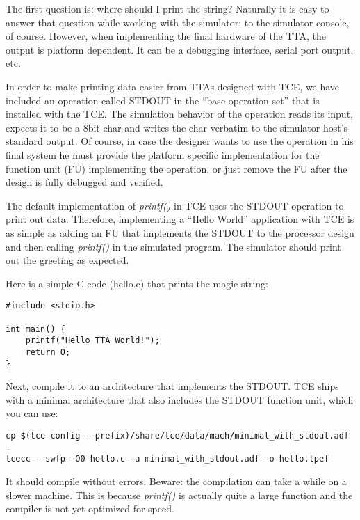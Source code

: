 \documentclass[twoside]{tceusermanual}
\begin{document}
The first question is: where should I print the string? Naturally 
it is easy to answer that question while working with the simulator: to
the simulator console, of course. However, when implementing the final
hardware of the TTA, the output is platform dependent. It can be a
debugging interface, serial port output, etc.

In order to make printing data easier from TTAs designed
with TCE, we have included an operation called STDOUT in the ``base operation 
set'' that is installed with the TCE. The simulation behavior of the 
operation reads its input, expects it to be a 8bit char and writes the char
verbatim to the simulator host's standard output. Of course, in case the 
designer wants to use the operation in his final system he must provide the 
platform specific implementation for the function unit (FU) implementing the 
operation, or just remove the FU after the design is fully debugged and
verified.

The default implementation of \textit{printf()} in TCE uses the STDOUT
operation to print out data. Therefore, implementing a ``Hello World''
application with TCE is as simple as adding an FU that implements
the STDOUT to the processor design and then calling \textit{printf()} in
the simulated program. The simulator should print out the greeting
as expected.

Here is a simple C code (hello.c) that prints the magic string:

\begin{verbatim}
#include <stdio.h>

int main() {
    printf("Hello TTA World!");
    return 0;
}
\end{verbatim}

Next, compile it to an architecture that implements the
STDOUT. TCE ships with a minimal architecture that also includes
the STDOUT function unit, which you can use:

\begin{verbatim}
cp $(tce-config --prefix)/share/tce/data/mach/minimal_with_stdout.adf .
tcecc --swfp -O0 hello.c -a minimal_with_stdout.adf -o hello.tpef
\end{verbatim}


It should compile without errors. Beware: the compilation can take
a while on a slower machine. This is because \textit{printf()} 
is actually quite a large function and the compiler is not yet optimized for 
speed.
\end{document}
